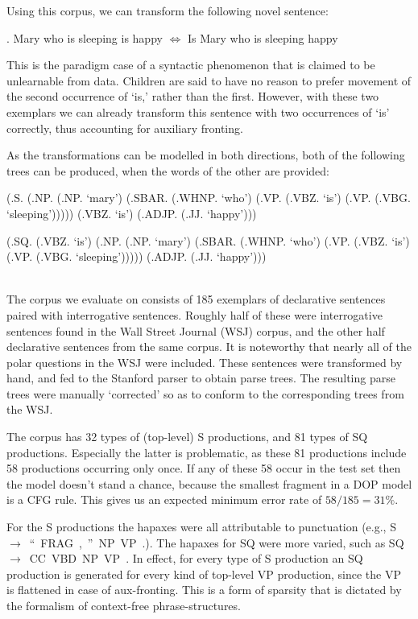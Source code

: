 \documentclass[a4paper]{article}
\theoremstyle{definition}
\begin{document}
Using this corpus, we can transform the following novel sentence:

\ex. Mary who is sleeping is happy $\iff$ Is Mary who is sleeping happy

This is the paradigm case of a syntactic phenomenon that is claimed to be
unlearnable from data. Children are said to have no reason to prefer movement
of the second occurrence of `is,' rather than the first. However, with these two
exemplars we can already transform this sentence with two occurrences of `is'
correctly, thus accounting for auxiliary fronting.

As the transformations can be modelled in both directions, both of the
following trees can be produced, when the words of the other are provided:
\\

\begin{parsetree}
\pthorgap{4pt}
\ptvergap{4pt}
(.S.
  (.NP.
    (.NP. `mary')
    (.SBAR.
      (.WHNP. `who')
      (.VP. (.VBZ. `is') (.VP. (.VBG. `sleeping')))))
  (.VBZ. `is')
  (.ADJP. (.JJ. `happy')))
\end{parsetree}
\begin{parsetree}
\pthorgap{4pt}
\ptvergap{4pt}
(.SQ.
  (.VBZ. `is')
  (.NP.
    (.NP. `mary')
    (.SBAR.
      (.WHNP. `who')
      (.VP. (.VBZ. `is') (.VP. (.VBG. `sleeping')))))
  (.ADJP. (.JJ. `happy')))
\end{parsetree} \\


The corpus we evaluate on consists of 185 exemplars of declarative sentences
paired with interrogative sentences. Roughly half of these were interrogative
sentences found in the Wall Street Journal (WSJ) corpus, and the other half
declarative sentences from the same corpus. It is noteworthy that nearly all of
the polar questions in the WSJ were included. These sentences were
transformed by hand, and fed to the Stanford parser to obtain parse trees. The
resulting parse trees were manually `corrected' so as to conform to the
corresponding trees from the WSJ. 

The corpus has 32 types of (top-level) S productions, and 81 types of SQ
productions.  Especially the latter is problematic, as these 81 productions
include 58 productions occurring only once. If any of these 58 occur in the
test set then the model doesn't stand a chance, because the smallest fragment
in a DOP model is a CFG rule. This gives us an expected minimum error rate
of $ 58 / 185 = 31\% $.

For the S productions the hapaxes were all attributable to punctuation (e.g., 
S~$\rightarrow$~``~FRAG~,~''~NP~VP~.). The hapaxes for SQ were more varied,
such as SQ~$\rightarrow$~CC~VBD~NP~VP~.  In effect, for every type of S
production an SQ production is generated for every kind of top-level VP
production, since the VP is flattened in case of aux-fronting. This is a form
of sparsity that is dictated by the formalism of context-free
phrase-structures.
\end{document}
